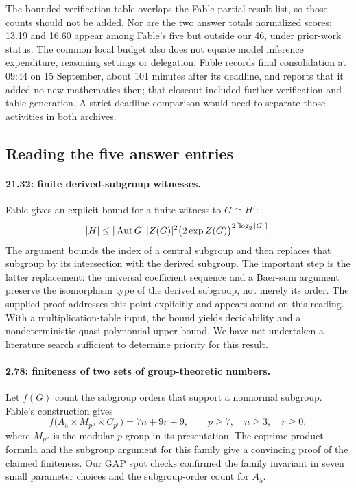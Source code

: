 The bounded-verification table overlaps the Fable partial-result list,
so those counts should not be added. Nor are the two answer totals
normalized scores: 13.19 and 16.60 appear among Fable's five but outside
our 46, under prior-work status. The common local budget also does not
equate model inference expenditure, reasoning settings or delegation.
Fable records final consolidation at 09:44 on 15 September, about
101 minutes after its deadline, and reports that it added no new
mathematics then; that closeout included further verification and table
generation. A strict deadline comparison would need to separate those
activities in both archives.

\subsection{Reading the five answer entries}

\paragraph{21.32: finite derived-subgroup witnesses.}
Fable gives an explicit bound for a finite witness to \(G\cong H'\):
\[
 |H|\le |\operatorname{Aut} G|\,|Z(G)|^2
       \bigl(2\exp Z(G)\bigr)^{2\lceil\log_2|G|\rceil}.
\]
The argument bounds the index of a central subgroup and then replaces
that subgroup by its intersection with the derived subgroup. The
important step is the latter replacement: the universal coefficient
sequence and a Baer-sum argument preserve the isomorphism type of the
derived subgroup, not merely its order. The supplied proof addresses
this point explicitly and appears sound on this reading. With a
multiplication-table input, the bound yields decidability and a
nondeterministic quasi-polynomial upper bound. We have not undertaken
a literature search sufficient to determine priority for this result.

\paragraph{2.78: finiteness of two sets of group-theoretic numbers.}
Let \(f(G)\) count the subgroup orders that support a nonnormal subgroup.
Fable's construction gives
\[
 f\bigl(A_5\times M_{p^n}\times C_{p^r}\bigr)=7n+9r+9,
 \qquad p\ge7,\quad n\ge3,\quad r\ge0,
\]
where \(M_{p^n}\) is the modular \(p\)-group in its presentation.
The coprime-product formula and the subgroup argument for this family
give a convincing proof of the claimed finiteness. Our GAP spot checks
confirmed the family invariant in seven small parameter choices and
the subgroup-order count for \(A_5\).

